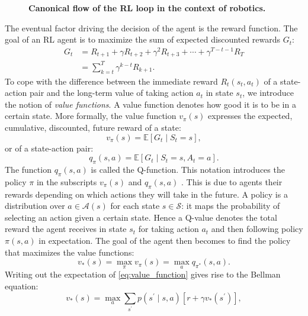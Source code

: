 \documentclass[\home/main.tex]{subfiles}
\begin{document}
\begin{figure}[htb]
	\centering
	
	\caption{\textbf{Canonical flow of the RL loop in the context of robotics.}}
	\label{fig:RL_loop_robotics}
\end{figure}

The eventual factor driving the decision of the agent is the reward function. The goal of an RL agent is to maximize the sum of expected discounted rewards $G_t$:
\begin{equation}
	\begin{split}
		G_{t} & =R_{t+1}+\gamma R_{t+2}+\gamma^{2} R_{t+3}+\cdots+\gamma^{T-t-1} R_{T} \\
		&		=\sum_{k=t}^{T} \gamma^{k-t} R_{k+1}.
	\end{split}
\end{equation}
To cope with the difference between the immediate reward $R_t(s_t, a_t)$ of a state-action pair and the long-term value of taking action $a_t$ in state $s_t$, we introduce the notion of \emph{value functions}. A value function denotes how good it is to be in a certain state. More formally, the value function $v_{\pi}(s)$ expresses the expected, cumulative, discounted, future reward of a state:
\begin{equation} \label{eq:value_function}
	v_{\pi}(s)=\mathbb{E}\left[G_{t} \mid S_{t}=s\right],
\end{equation}
or of a state-action pair:
\begin{equation}
	q_{\pi}(s, a)=\mathbb{E}\left[G_{t} \mid S_{t}=s, A_{t}=a\right].
\end{equation}
The function $q_{\pi}(s, a)$ is called the Q-function. This notation introduces the policy $\pi$ in the subscripts $v_{\pi}(s)$ and $q_{\pi}(s, a)$ . This is due to agents their rewards depending on which actions they will take in the future. A policy is a distribution over $a \in \mathcal{A}(s)$ for each state $s \in \mathcal{S}$: it maps the probability of selecting an action given a certain state. Hence a Q-value denotes the total reward the agent receives in state $s_t$ for taking action $a_t$ and then following policy $\pi(s,a)$ in expectation. The goal of the agent then becomes to find the policy that maximizes the value functions:
\begin{equation}
	v_{*}(s)=\max _{\pi} v_{\pi}(s)=\max _{a} q_{\pi^{*}}(s, a).
\end{equation}
Writing out the expectation of \cref{eq:value_function} gives rise to the Bellman equation:
\begin{equation}
	v_{*}(s)=\max _{a} \sum_{s^{\prime}} p\left(s^{\prime} \mid s, a\right)\left[r+\gamma v_{*}\left(s^{\prime}\right)\right],
\end{equation}
\end{document}
